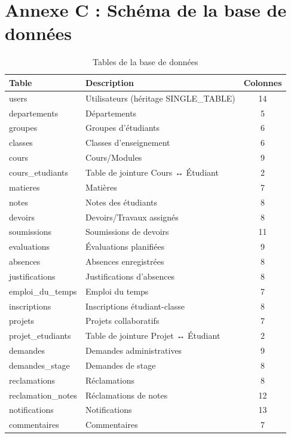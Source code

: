 \section*{Annexe C : Schéma de la base de données}

\begin{table}[H]
\centering
\caption{Tables de la base de données}
\begin{tabularx}{\textwidth}{lXc}
\toprule
\textbf{Table} & \textbf{Description} & \textbf{Colonnes} \\
\midrule
users & Utilisateurs (héritage SINGLE\_TABLE) & 14 \\
departements & Départements & 5 \\
groupes & Groupes d'étudiants & 6 \\
classes & Classes d'enseignement & 6 \\
cours & Cours/Modules & 9 \\
cours\_etudiants & Table de jointure Cours ↔ Étudiant & 2 \\
matieres & Matières & 7 \\
notes & Notes des étudiants & 8 \\
devoirs & Devoirs/Travaux assignés & 8 \\
soumissions & Soumissions de devoirs & 11 \\
evaluations & Évaluations planifiées & 9 \\
absences & Absences enregistrées & 8 \\
justifications & Justifications d'absences & 8 \\
emploi\_du\_temps & Emploi du temps & 7 \\
inscriptions & Inscriptions étudiant-classe & 8 \\
projets & Projets collaboratifs & 7 \\
projet\_etudiants & Table de jointure Projet ↔ Étudiant & 2 \\
demandes & Demandes administratives & 9 \\
demandes\_stage & Demandes de stage & 8 \\
reclamations & Réclamations & 8 \\
reclamation\_notes & Réclamations de notes & 12 \\
notifications & Notifications & 13 \\
commentaires & Commentaires & 7 \\
\bottomrule
\end{tabularx}
\end{table}

